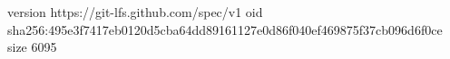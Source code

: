 version https://git-lfs.github.com/spec/v1
oid sha256:495e3f7417eb0120d5cba64dd89161127e0d86f040ef469875f37cb096d6f0ce
size 6095
